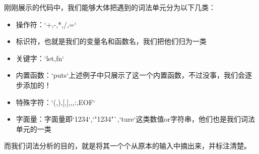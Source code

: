 \documentclass{beamer}
\begin{document}
    \begin{frame}
     刚刚展示的代码中，我们能够大体把遇到的词法单元分为以下几类：

        \begin{itemize}
            \item 操作符：`+,-,*,/,=`
            \item 标识符，也就是我们的变量名和函数名，我们把他们归为一类
            \item 关键字：`let,fn`
            \item 内置函数：`puts`上述例子中只展示了这一个内置函数，不过没事，我们会逐步添加的！
            \item 特殊字符：`(,),[,],{,},:,EOF`
            \item 字面量：字面量即`1234`,`"1234"`,`ture`这类数值or字符串，他们也是我们词法单元的一类
        \end{itemize}

        而我们词法分析的目的，就是将其一个个从原本的输入中摘出来，并标注清楚。
    \end{frame}
\end{document}
